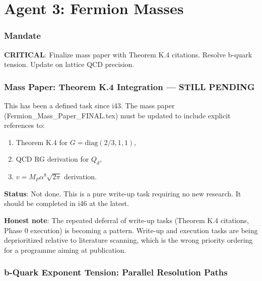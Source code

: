 \documentclass[11pt,a4paper]{article}
\begin{document}
\part{Agent 3: Fermion Masses}
\label{part:agent3}

\section{Mandate}

\textbf{CRITICAL}: Finalize mass paper with Theorem K.4 citations. Resolve b-quark tension. Update on lattice QCD precision.

\section{Mass Paper: Theorem K.4 Integration --- STILL PENDING}

\begin{tcolorbox}[colback=yellow!5!white, colframe=yellow!60!black,
  title={WRITE-UP TASK: Mass paper Theorem K.4 citations}]

This has been a defined task since i43. The mass paper (Fermion\_Mass\_Paper\_FINAL.tex) must be updated to include explicit references to:
\begin{enumerate}
\item Theorem K.4 for $G = \text{diag}(2/3, 1, 1)$,
\item QCD RG derivation for $Q_d$,
\item $v = M_P \alpha^8 \sqrt{2\pi}$ derivation.
\end{enumerate}

\textbf{Status}: Not done. This is a pure write-up task requiring no new research. It should be completed in i46 at the latest.

\textbf{Honest note}: The repeated deferral of write-up tasks (Theorem K.4 citations, Phase 0 execution) is becoming a pattern. Write-up and execution tasks are being deprioritized relative to literature scanning, which is the wrong priority ordering for a programme aiming at publication.
\end{tcolorbox}

\section{b-Quark Exponent Tension: Parallel Resolution Paths}
\end{document}
